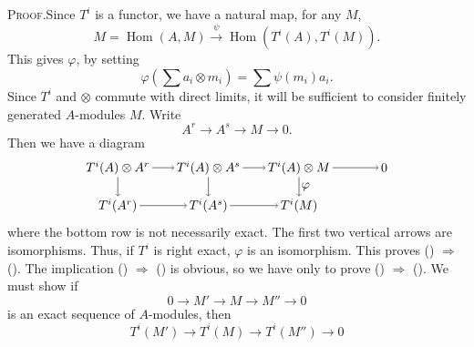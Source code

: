 {\noindent\textsc{Proof.}\enspace Since $T^i$ is a functor, we have a natural map, for any $M$,
\[
 M=\operatorname{Hom}(A,M)\xrightarrow{\psi}\operatorname{Hom}(T^i(A),T^i(M)).
\]
This gives $\varphi$, by setting
\[
 \varphi(\sum a_i\otimes m_i)=\sum\psi(m_i)a_i.
\]
Since $T^i$ and $\otimes$ commute with direct limits, it will be sufficient to consider finitely generated $A$-modules $M$. Write
\[
 A^r\to A^s\to M\to0.
\]
Then we have a diagram
\[
\begin{tikzpicture}[baseline=(current bounding box.center),inner sep=1.75pt]
  \node (a1) at (0,1.05) {$T^i(A)\otimes A^r$};
  \node (b1) at (0,0) {$T^i(A^r)$};
  \node (a2) at (2.5,1.05) {$T^i(A)\otimes A^s$};
  \node (b2) at (2.5,0) {$T^i(A^s)$};
  \node (a3) at (5,1.05) {$T^i(A)\otimes M$};
  \node (b3) at (5,0) {$T^i(M)$};
  \node (a4) at (7.35,1.05) {$0$};
  \draw[->] (a1) -- (a2); \draw[->] (a2) -- (a3); \draw[->] (a3) -- (a4);
  \draw[->] (b1) -- (b2); \draw[->] (b2) -- (b3);
  \draw[->] (a1) -- (b1); \draw[->] (a2) -- (b2);
  \draw[->] (a3) -- node[right] {$\varphi$} (b3);
\end{tikzpicture}
\]
where the bottom row is not necessarily exact. The first two vertical arrows are isomorphisms. Thus, if $T^i$ is right exact, $\varphi$ is an isomorphism. This proves () $\Rightarrow$ (). The implication () $\Rightarrow$ () is obvious, so we have only to prove () $\Rightarrow$ (). We must show if
\[
 0\to M'\to M\to M''\to0
\]
is an exact sequence of $A$-modules, then
\[
 T^i(M')\to T^i(M)\to T^i(M'')\to0
\]
}
